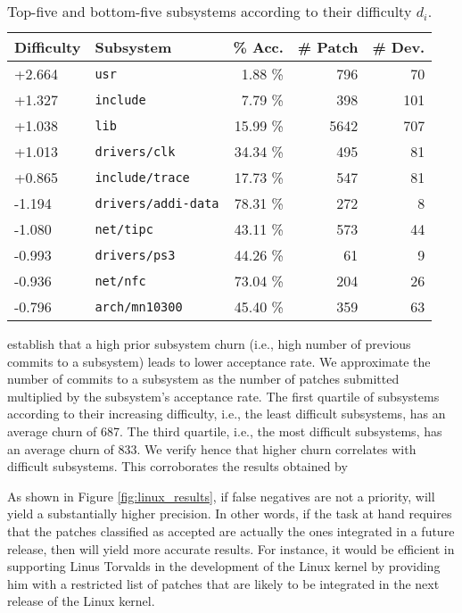 \begin{table}
	\caption{Top-five and bottom-five subsystems according to their difficulty $d_i$.}
	\label{tab:linux_subsystems}
	\begin{tabular}{llrrr}
		\toprule
		Difficulty & Subsystem                  & \% Acc.  & \# Patch & \# Dev. \\
		\midrule
		+2.664     & \texttt{usr}               & 1.88 \%  & 796      & 70      \\
		+1.327     & \texttt{include}           & 7.79 \%  & 398      & 101     \\
		+1.038     & \texttt{lib}               & 15.99 \% & 5642     & 707     \\
		+1.013     & \texttt{drivers/clk}       & 34.34 \% & 495      & 81      \\
		+0.865     & \texttt{include/trace}     & 17.73 \% & 547      & 81      \\
		\midrule
		-1.194     & \texttt{drivers/addi-data} & 78.31 \% & 272      & 8       \\
		-1.080     & \texttt{net/tipc}          & 43.11 \% & 573      & 44      \\
		-0.993     & \texttt{drivers/ps3}       & 44.26 \% & 61       & 9       \\
		-0.936     & \texttt{net/nfc}           & 73.04 \% & 204      & 26      \\
		-0.796     & \texttt{arch/mn10300}      & 45.40 \% & 359      & 63      \\
		\bottomrule
	\end{tabular}
\end{table}

\citet{jiang2013will} establish that a high prior subsystem churn (i.e., high number of previous commits to a subsystem) leads to lower acceptance rate.
We approximate the number of commits to a subsystem as the number of patches submitted multiplied by the subsystem's acceptance rate.
The first quartile of subsystems according to their increasing difficulty, i.e., the least difficult subsystems, has an average churn of \num{687}.
The third quartile, i.e., the most difficult subsystems, has an average churn of \num{833}.
We verify hence that higher churn correlates with difficult subsystems.
This corroborates the results obtained by \citeauthor{jiang2013will}

As shown in Figure \ref{fig:linux_results}, if false negatives are not a priority, \interank{} will yield a substantially higher precision.
In other words, if the task at hand requires that the patches classified as accepted are actually the ones integrated in a future release, then \interank{} will yield more accurate results.
For instance, it would be efficient in supporting Linus Torvalds in the development of the Linux kernel by providing him with a restricted list of patches that are likely to be integrated in the next release of the Linux kernel.

